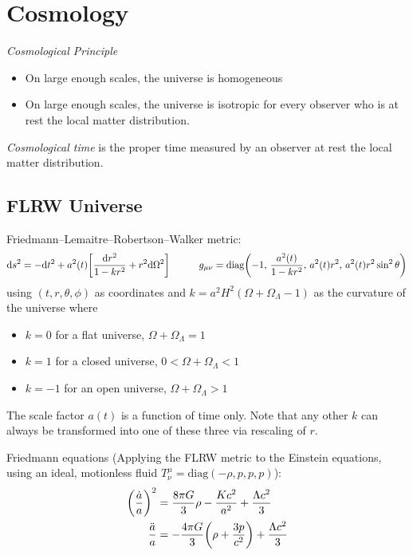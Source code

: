 \section{Cosmology}
	\emph{Cosmological Principle}
	\begin{itemize}
		\item On large enough scales, the universe is homogeneous
		\item On large enough scales, the universe is isotropic for every observer who is at rest \wrt the local matter distribution.
	\end{itemize}

	\noindent
	\emph{Cosmological time} is the proper time measured by an observer at rest \wrt the local matter distribution.

	\subsection{FLRW Universe}
	Friedmann--Lemaitre--Robertson--Walker metric:
		\begin{equation}
			\dd s^2 = -\dd t^2 + a^2(t) \qty[\frac{\dd r^2}{1-kr^2} + r^2 \dd \Omega^2]
			\hspace{30pt}
			g_{\mu\nu} = \mathrm{diag}\qty(-1,\, \frac{a^2(t)}{1-kr^2},\, a^2(t) r^2,\, a^2(t) r^2 \sin^2 \theta)
		\end{equation}
		using $(t, r, \theta, \phi)$ as coordinates and $k = a^2 H^2 ( \Omega + \Omega_\Lambda - 1)$ as the curvature of the universe where
		\begin{itemize}
			\item $k=0$ for a flat universe, \ie $\Omega + \Omega_\Lambda = 1$
			\item $k=1$ for a closed universe, \ie $0 < \Omega + \Omega_\Lambda < 1$
			\item $k=-1$ for an open universe, \ie $\Omega + \Omega_\Lambda > 1$
		\end{itemize}
		The scale factor $a(t)$ is a function of time only. Note that any other $k$ can always be transformed into one of these three via rescaling of $r$.

		\noindent
		Friedmann equations (Applying the FLRW metric to the Einstein equations, using an ideal, motionless fluid $T^\mu_\nu = \text{diag}(-\rho, p, p, p)$):
		\begin{equation}
			\begin{aligned}
				\qty(\frac{\dot{a}}{a})^2 &= \frac{8 \pi G}{3} \rho - \frac{K c^2}{a^2} + \frac{\Lambda c^2}{3} \\
				\frac{\ddot{a}}{a} &= -\frac{4 \pi G}{3} \qty(\rho + \frac{3p}{c^2}) + \frac{\Lambda c^2}{3} \\
			\end{aligned}
		\end{equation}

